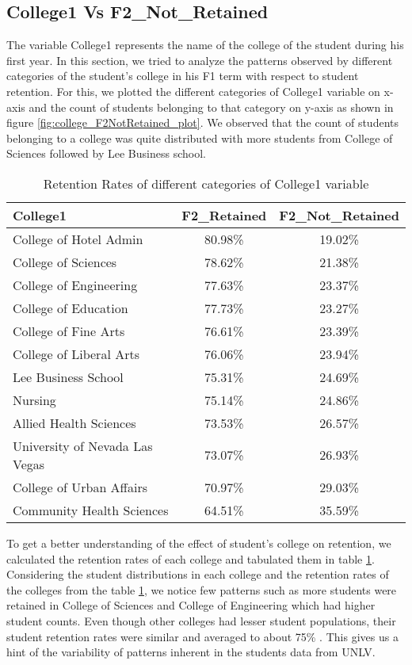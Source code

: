 \documentclass[11pt,openright]{report}
\begin{document}
\subsection {College1 Vs F2\_Not\_Retained}
The variable College1 represents the name of the college of the student during his first year. In this section, we tried to analyze the patterns observed by different categories of the student's college in his F1 term with respect to student retention. For this, we plotted the different categories of College1 variable on x-axis and the count of students belonging to that category on y-axis as shown in figure \ref{fig:college_F2NotRetained_plot}. We observed that the count of students belonging to a college was quite distributed with more students from College of Sciences followed by Lee Business school.


\begin{table}
	\renewcommand{\arraystretch}{1.3}
	\caption{Retention Rates of different categories of College1 variable}
	\label{table:college_retentions}
	\centering
	\begin{tabular}{|l|c|c|}
		\hline
		\bfseries College1 & \bfseries F2\_Retained & \bfseries F2\_Not\_Retained\\
		\hline
		College of Hotel Admin  & 80.98\%  & 19.02\% \\ \hline
		College of Sciences & 78.62\% &  21.38\% \\ \hline
		College of Engineering & 77.63\% & 23.37\% \\ \hline
		College of Education    &   77.73\% &  23.27\% \\ \hline
		College of Fine Arts &  76.61\%  & 23.39\% \\ \hline
		College of Liberal Arts & 76.06\% & 23.94\% \\ \hline
		Lee Business School  & 75.31\% &  24.69\% \\ \hline
		Nursing    &  75.14\%  & 24.86\% \\ \hline
		Allied Health Sciences  & 73.53\% &  26.57\% \\ \hline
		University of Nevada Las Vegas     & 73.07\% &  26.93\% \\ \hline
		College of Urban Affairs  &         70.97\% &  29.03\% \\ \hline
		Community Health Sciences         &    64.51\% & 35.59\% \\ \hline
	\end{tabular}
\end{table}


To get a better understanding of the effect of student's college on retention, we calculated the retention rates of each college and tabulated them in table \ref{table:college_retentions}. Considering the student distributions in each college and the retention rates of the colleges from the table \ref{table:college_retentions}, we notice few patterns such as more students were retained in College of Sciences and College of Engineering which had higher student counts. Even though other colleges had lesser student populations, their student retention rates were similar and averaged to about 75\% . This gives us a hint of the variability of patterns inherent in the students data from UNLV.
\end{document}
